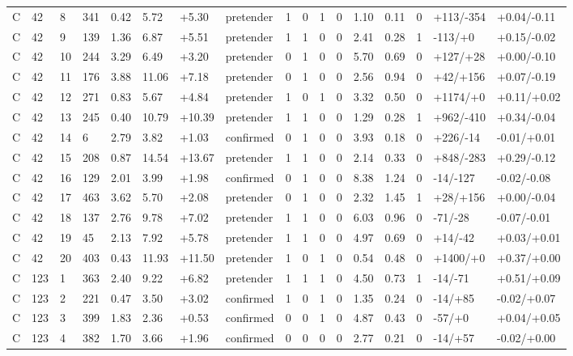 \documentclass[11pt,a4paper]{article}
\begin{document}
{\begin{longtable}[]{@{}lllllllllllllllll@{}}
C & 42 & 8 & 341 & 0.42 & 5.72 & +5.30 & pretender & 1 & 0 & 1 & 0 & 1.10 & 0.11 & 0 & +113/-354 & +0.04/-0.11 \\
C & 42 & 9 & 139 & 1.36 & 6.87 & +5.51 & pretender & 1 & 1 & 0 & 0 & 2.41 & 0.28 & 1 & -113/+0 & +0.15/-0.02 \\
C & 42 & 10 & 244 & 3.29 & 6.49 & +3.20 & pretender & 0 & 1 & 0 & 0 & 5.70 & 0.69 & 0 & +127/+28 & +0.00/-0.10 \\
C & 42 & 11 & 176 & 3.88 & 11.06 & +7.18 & pretender & 0 & 1 & 0 & 0 & 2.56 & 0.94 & 0 & +42/+156 & +0.07/-0.19 \\
C & 42 & 12 & 271 & 0.83 & 5.67 & +4.84 & pretender & 1 & 0 & 1 & 0 & 3.32 & 0.50 & 0 & +1174/+0 & +0.11/+0.02 \\
C & 42 & 13 & 245 & 0.40 & 10.79 & +10.39 & pretender & 1 & 1 & 0 & 0 & 1.29 & 0.28 & 1 & +962/-410 & +0.34/-0.04 \\
C & 42 & 14 & 6 & 2.79 & 3.82 & +1.03 & confirmed & 0 & 1 & 0 & 0 & 3.93 & 0.18 & 0 & +226/-14 & -0.01/+0.01 \\
C & 42 & 15 & 208 & 0.87 & 14.54 & +13.67 & pretender & 1 & 1 & 0 & 0 & 2.14 & 0.33 & 0 & +848/-283 & +0.29/-0.12 \\
C & 42 & 16 & 129 & 2.01 & 3.99 & +1.98 & confirmed & 0 & 1 & 0 & 0 & 8.38 & 1.24 & 0 & -14/-127 & -0.02/-0.08 \\
C & 42 & 17 & 463 & 3.62 & 5.70 & +2.08 & pretender & 0 & 1 & 0 & 0 & 2.32 & 1.45 & 1 & +28/+156 & +0.00/-0.04 \\
C & 42 & 18 & 137 & 2.76 & 9.78 & +7.02 & pretender & 1 & 1 & 0 & 0 & 6.03 & 0.96 & 0 & -71/-28 & -0.07/-0.01 \\
C & 42 & 19 & 45 & 2.13 & 7.92 & +5.78 & pretender & 1 & 1 & 0 & 0 & 4.97 & 0.69 & 0 & +14/-42 & +0.03/+0.01 \\
C & 42 & 20 & 403 & 0.43 & 11.93 & +11.50 & pretender & 1 & 0 & 1 & 0 & 0.54 & 0.48 & 0 & +1400/+0 & +0.37/+0.00 \\
C & 123 & 1 & 363 & 2.40 & 9.22 & +6.82 & pretender & 1 & 1 & 1 & 0 & 4.50 & 0.73 & 1 & -14/-71 & +0.51/+0.09 \\
C & 123 & 2 & 221 & 0.47 & 3.50 & +3.02 & confirmed & 1 & 0 & 1 & 0 & 1.35 & 0.24 & 0 & -14/+85 & -0.02/+0.07 \\
C & 123 & 3 & 399 & 1.83 & 2.36 & +0.53 & confirmed & 0 & 0 & 1 & 0 & 4.87 & 0.43 & 0 & -57/+0 & +0.04/+0.05 \\
C & 123 & 4 & 382 & 1.70 & 3.66 & +1.96 & confirmed & 0 & 0 & 0 & 0 & 2.77 & 0.21 & 0 & -14/+57 & -0.02/+0.00 \\

\end{longtable}}
\end{document}
